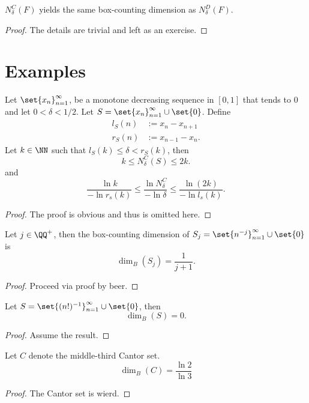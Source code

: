 \begin{thm}
	$N^C_\delta(F)$ yields the same box-counting dimension as $N^D_\delta(F)$.
\end{thm}
\begin{proof}
	The details are trivial and left as an exercise.
\end{proof}

\section{Examples}

\begin{lemma}
	Let $\set{x_n}_{n=1}^\infty$, be a monotone decreasing sequence in $[0,1]$ that tends to 0 and let $0 < \delta < 1/2$.
	Let $S=\set{x_n}_{n=1}^\infty\cup\set{0}$.
	Define
	\begin{align*}
		l_S(n)&:= x_n-x_{n+1}\\
		r_S(n)&:= x_{n-1}-x_n.
	\end{align*}
	Let $k\in\NN$ such that $l_S(k)\leq \delta < r_S(k)$, then
	\[
		k \leq N^C_\delta(S)\leq 2k.
	\]
	and
	\[
		\frac{\ln k}{-\ln r_s(k)}\leq \frac{\ln N^C_\delta}{-\ln\delta}\leq\frac{\ln (2k)}{-\ln l_s(k)}.
	\]
\end{lemma}
\begin{proof}
	The proof is obvious and thus is omitted here.
\end{proof}

\begin{example}
	Let $j\in\QQ^+$, then the box-counting dimension of $S_j=\set{n^{-j}}_{n=1}^\infty\cup\set{0}$ is
	\[
		\dim_B(S_j)=\frac{1}{j+1}.
	\]
\end{example}
\begin{proof}
	Proceed via proof by beer.
\end{proof}

\begin{example}
	Let $S=\set{(n!)^{-1}}_{n=1}^\infty\cup\set{0}$, then
	\[
		\dim_B(S)=0.
	\]
\end{example}
\begin{proof}
	Assume the result.
\end{proof}

\begin{example}
	Let $C$ denote the middle-third Cantor set.
	\[
		\dim_B(C)=\frac{\ln2}{\ln3}
	\]
\end{example}
\begin{proof}
	The Cantor set is wierd.
\end{proof}

